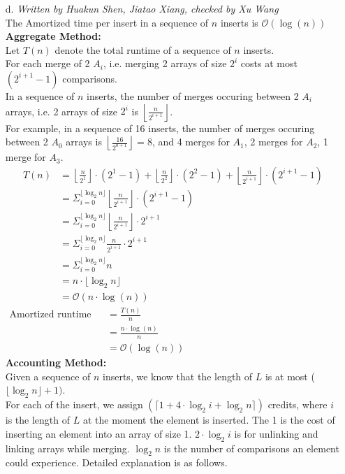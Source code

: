 \documentclass[10pt]{article}
\begin{document}
\begin{itemize}
\item[d.]\textit{Written by Huakun Shen, Jiatao Xiang, checked by Xu Wang}\\
The Amortized time per insert in a sequence of $n$ inserts is $\mathcal{O}(\log(n))$\\
\textbf{Aggregate Method:}\\
Let $T(n)$ denote the total runtime of a sequence of $n$ inserts.\\
For each merge of 2 $A_i$, i.e. merging 2 arrays of size $2^i$ costs at most $(2^{i+1}-1)$ comparisons.\\
In a sequence of $n$ inserts, the number of merges occuring between 2 $A_i$ arrays, i.e. 2 arrays of size $2^i$ is $\left\lfloor\frac{n}{2^{i+1}}\right\rfloor$.\\
For example, in a sequence of 16 inserts, the number of merges occuring between 2 $A_0$ arrays is $\left\lfloor\frac{16}{2^{0+1}}\right\rfloor = 8$, and 4 merges for $A_1$, 2 merges for $A_2$, 1 merge for $A_3$.
\begin{align*}
T(n) &= \left\lfloor\frac{n}{2^1}\right\rfloor\cdot(2^1-1)+\left\lfloor\frac{n}{2^2}\right\rfloor\cdot(2^2-1)+\left\lfloor\frac{n}{2^{i+1}}\right\rfloor\cdot(2^{i+1}-1)\\
&=\Sigma^{\lfloor\log_2n\rfloor}_{i=0}\left\lfloor\frac{n}{2^{i+1}}\right\rfloor\cdot(2^{i+1}-1)\\
&=\Sigma^{\lfloor\log_2n\rfloor}_{i=0}\left\lfloor\frac{n}{2^{i+1}}\right\rfloor\cdot2^{i+1}\\
&=\Sigma^{\lfloor\log_2n\rfloor}_{i=0}\frac{n}{2^{i+1}}\cdot2^{i+1}\\
&=\Sigma^{\lfloor\log_2n\rfloor}_{i=0}n\\
&=n\cdot\lfloor\log_2n\rfloor\\
&=\mathcal{O}(n\cdot\log(n))
\end{align*}
\begin{align*}
\text{Amortized runtime per insert}&=\frac{T(n)}{n}\hspace{20em}\\
&=\frac{n\cdot\log(n)}{n}\\
&=\mathcal{O}(\log(n))
\end{align*}
\textbf{Accounting Method:}\\
Given a sequence of $n$ inserts, we know that the length of $L$ is at most ($\lfloor\log_2n\rfloor + 1)$.\\
For each of the insert, we assign $(\lceil 1+4\cdot\log_2i+\log_2n\rceil)$ credits, where $i$ is the length of $L$ at the moment the element is inserted. The 1 is the cost of inserting an element into an array of size 1. $2\cdot\log_2i$ is for unlinking and linking arrays while merging. $\log_2n$ is the number of comparisons an element could experience. Detailed explanation is as follows.\\

\end{itemize}
\end{document}

